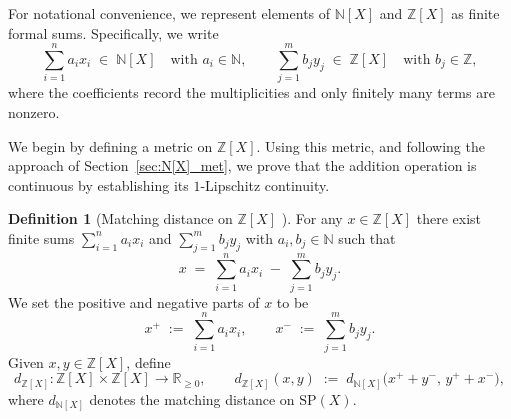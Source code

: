 \documentclass[10pt,a4paper]{article}
\theoremstyle{definition}
\newtheorem{definition}[theorem]{Definition}
\newcommand{\SP}{\mathrm{SP}}
\newcommand{\Z}{\mathbb{Z}}
\newcommand{\R}{\mathbb{R}}
\newcommand{\N}{\mathbb{N}}
\begin{document}
For notational convenience, we represent elements of $\N[X]$ and $\Z[X]$ as
finite formal sums. Specifically, we write
\[
\sum_{i=1}^{n} a_i x_i \;\in\; \N[X] \quad\text{with } a_i \in \N,
\qquad
\sum_{j=1}^{m} b_j y_j \;\in\; \Z[X] \quad\text{with } b_j \in \Z,
\]
where the coefficients record the multiplicities and only finitely many terms
are nonzero.

We begin by defining a metric on $\Z[X]$. Using this metric, and following the
approach of Section~\ref{sec:N[X]_met}, we prove that the addition operation is
continuous by establishing its $1$-Lipschitz continuity.
\begin{definition}[Matching distance on {$\Z[X]$} ]\label{def:Z[X]_metric}
For any $x\in \Z[X]$ there exist finite sums $\sum_{i=1}^{n} a_i x_i$ and
$\sum_{j=1}^{m} b_j y_j$ with $a_i,b_j\in \N$ such that
\[
x \;=\; \sum_{i=1}^{n} a_i x_i \;-\; \sum_{j=1}^{m} b_j y_j .
\]
We set the positive and negative parts of $x$ to be
\[
x^{+} \;:=\; \sum_{i=1}^{n} a_i x_i,
\qquad
x^{-} \;:=\; \sum_{j=1}^{m} b_j y_j .
\]
Given $x,y\in \Z[X]$, define
\[
d_{\Z[X]} \colon \Z[X]\times \Z[X] \longrightarrow \R_{\ge 0},
\qquad
d_{\Z[X]}(x,y)\;:=\; d_{\N[X]}\!\bigl(x^{+}+y^{-},\, y^{+}+x^{-}\bigr),
\]
where $d_{\N[X]}$ denotes the matching distance on $\SP(X)$.
\end{definition}
\end{document}
